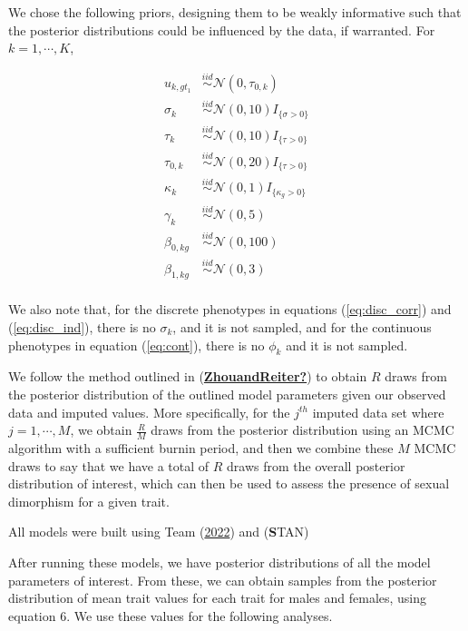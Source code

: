 \documentclass[
  12pt,
]{article}
\begin{document}
We chose the following priors, designing them to be weakly informative
such that the posterior distributions could be influenced by the data,
if warranted. For \(k = 1,\cdots,K\),

\begin{align}
u_{k,gt_1} & \overset{iid}{\sim}\mathcal{N}(0,\tau_{0,k}) \nonumber \\
\sigma_k & \overset{iid}{\sim}\mathcal{N}(0,10)I_{\{\sigma > 0\}} \nonumber \\
\tau_k & \overset{iid}{\sim}\mathcal{N}(0,10)I_{\{\tau > 0\}} \nonumber \\
\tau_{0,k} & \overset{iid}{\sim}\mathcal{N}(0,20)I_{\{\tau > 0\}} \nonumber \\
\kappa_k & \overset{iid}{\sim}\mathcal{N}(0,1)I_{\{\kappa_g > 0\}} \nonumber \\
\gamma_{k} & \overset{iid}{\sim}\mathcal{N}(0,5) \nonumber \\
\beta_{0,kg} & \overset{iid}{\sim}\mathcal{N}(0,100) \nonumber \\
\beta_{1,kg} & \overset{iid}{\sim}\mathcal{N}(0,3) \nonumber \\
\label{eq:priors}
\end{align}

We also note that, for the discrete phenotypes in equations
(\ref{eq:disc_corr}) and (\ref{eq:disc_ind}), there is no \(\sigma_k\),
and it is not sampled, and for the continuous phenotypes in equation
(\ref{eq:cont}), there is no \(\phi_k\) and it is not sampled.

We follow the method outlined in
(\protect\hyperlink{ref-ZhouandReiter}{\textbf{ZhouandReiter?}}) to
obtain \(R\) draws from the posterior distribution of the outlined model
parameters given our observed data and imputed values. More
specifically, for the \(j^{th}\) imputed data set where
\(j = 1,\cdots,M\), we obtain \(\frac{R}{M}\) draws from the posterior
distribution using an MCMC algorithm with a sufficient burnin period,
and then we combine these \(M\) MCMC draws to say that we have a total
of \(R\) draws from the overall posterior distribution of interest,
which can then be used to assess the presence of sexual dimorphism for a
given trait.

All models were built using Team
(\protect\hyperlink{ref-R2022language}{2022}) and (\textbf STAN)

After running these models, we have posterior distributions of all the
model parameters of interest. From these, we can obtain samples from the
posterior distribution of mean trait values for each trait for males and
females, using equation 6. We use these values for the following
analyses.
\end{document}
